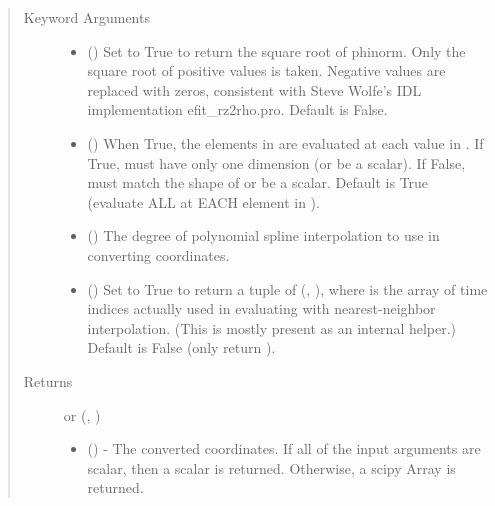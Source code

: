 \documentclass[letterpaper,10pt,english]{sphinxmanual}
\begin{document}
\begin{fulllineitems}
\begin{fulllineitems}
\begin{quote}
\begin{description}
\item[{Keyword Arguments}] \leavevmode\begin{itemize}
\item {} 
 () \textendash{} Set to True to return the square root of phinorm.
Only the square root of positive values is taken. Negative
values are replaced with zeros, consistent with Steve Wolfe’s
IDL implementation efit\_rz2rho.pro. Default is False.

\item {} 
 () \textendash{} When True, the elements in  are evaluated
at each value in . If True,  must have only one dimension
(or be a scalar). If False,  must match the shape of 
or be a scalar. Default is True (evaluate ALL  at EACH
element in ).

\item {} 
 () \textendash{} The degree of polynomial spline interpolation to
use in converting coordinates.

\item {} 
 () \textendash{} Set to True to return a tuple of (,
), where  is the array of time indices
actually used in evaluating  with nearest-neighbor
interpolation. (This is mostly present as an internal helper.)
Default is False (only return ).

\end{itemize}

\item[{Returns}] \leavevmode

 or (, )
\begin{itemize}
\item {} 
 () - The converted coordinates. If
all of the input arguments are scalar, then a scalar is returned.
Otherwise, a scipy Array is returned.


\end{itemize}
\end{description}
\end{quote}
\end{fulllineitems}
\end{fulllineitems}
\end{document}
